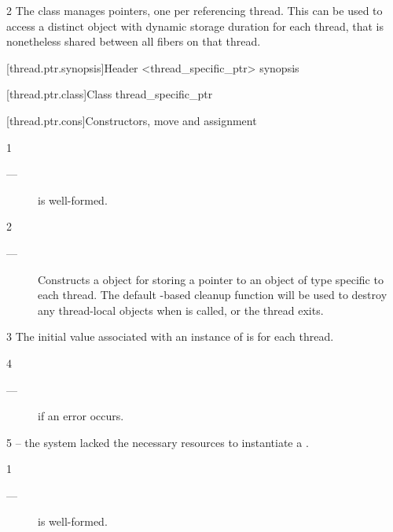 \documentclass[fontsize=10pt,paper=A4,pagesize,DIV=15]{scrartcl}
\begin{document}
2 The \tptr class manages pointers, one per referencing thread. This can be
used to access a distinct object with dynamic storage duration for each
thread, that is nonetheless shared between all fibers on that thread.

[thread.ptr.synopsis]{Header <thread\_specific\_ptr> synopsis}



[thread.ptr.class]{Class thread\_specific\_ptr}


[thread.ptr.cons]{Constructors, move and assignment}


1 \mandates
\begin{description}
    \item[---]  is well-formed.
\end{description}

2 \effects
\begin{description}
    \item[---] Constructs a  object for storing a
               pointer to an object of type  specific to each thread.
               The default -based cleanup function will be used to
               destroy any thread-local objects when  is called,
               or the thread exits.
\end{description}

3 \remarks
The initial value associated with an instance of \tptr is  for
each thread.

4 \except
\begin{description}
    \item[---]  if an error occurs.
\end{description}

5 \errors
{} -- the system lacked the necessary
resources to instantiate a \tptr.


1 \mandates
\begin{description}
    \item[---]  is well-formed.
\end{description}
\end{document}
